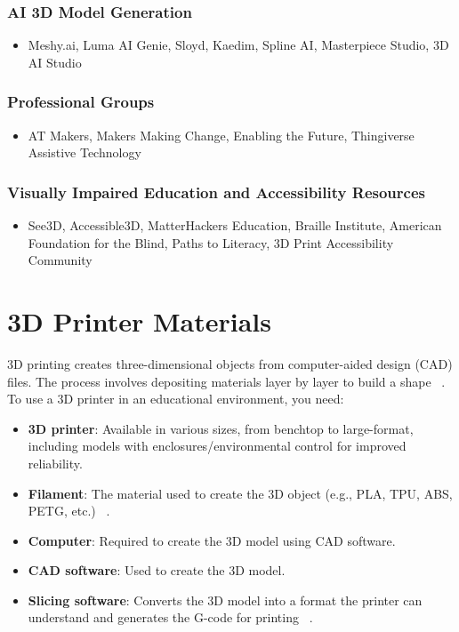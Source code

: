 \subsubsection{AI 3D Model Generation}

\begin{itemize}
    \item Meshy.ai, Luma AI Genie, Sloyd, Kaedim, Spline AI, Masterpiece Studio, 3D AI Studio
\end{itemize}

\subsubsection{Professional Groups}

\begin{itemize}
    \item AT Makers, Makers Making Change, Enabling the Future, Thingiverse Assistive Technology
\end{itemize}

\subsubsection{Visually Impaired Education and Accessibility Resources}

\begin{itemize}
    \item See3D, Accessible3D, MatterHackers Education, Braille Institute, American Foundation for the Blind, Paths to Literacy, 3D Print Accessibility Community
\end{itemize}

\section{3D Printer Materials}\label{d-printer-materials}
3D printing creates three-dimensional objects from computer-aided design (CAD) files. The process involves depositing materials layer by layer to build a shape~ \cite{DassaultEducation}. To use a 3D printer in an educational environment, you need:

\begin{itemize}

    \item \textbf{3D printer}: Available in various sizes, from benchtop to large-format, including models with enclosures/environmental control for improved reliability.

    \item \textbf{Filament}: The material used to create the 3D object (e.g., PLA, TPU, ABS, PETG, etc.)~ \cite{TechLearning2023}.

    \item \textbf{Computer}: Required to create the 3D model using CAD software.

    \item \textbf{CAD software}: Used to create the 3D model.

    \item \textbf{Slicing software}: Converts the 3D model into a format the printer can understand and generates the G-code for printing~ \cite{TeachThought2021}.

\end{itemize}


